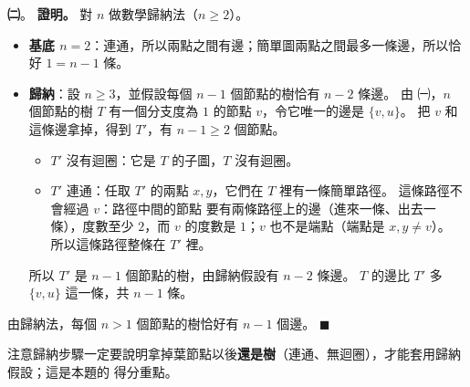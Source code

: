 \begin{pastsoln}
\textbf{㈡}。 \textbf{證明。} 對 $n$ 做數學歸納法（$n \ge 2$）。
\begin{itemize}
\item \textbf{基底 $n = 2$}：連通，所以兩點之間有邊；簡單圖兩點之間最多一條邊，所以恰好 $1 = n - 1$ 條。
\item \textbf{歸納}：設 $n \ge 3$，並假設每個 $n - 1$ 個節點的樹恰有 $n - 2$ 條邊。 由 ㈠，$n$ 個節點的樹 $T$
有一個分支度為 $1$ 的節點 $v$，令它唯一的邊是 $\{v, u\}$。 把 $v$ 和這條邊拿掉，得到 $T'$，有 $n - 1 \ge 2$
個節點。
  \begin{itemize}
  \item $T'$ 沒有迴圈：它是 $T$ 的子圖，$T$ 沒有迴圈。
  \item $T'$ 連通：任取 $T'$ 的兩點 $x, y$，它們在 $T$ 裡有一條簡單路徑。 這條路徑不會經過 $v$：路徑中間的節點
  要有兩條路徑上的邊（進來一條、出去一條），度數至少 $2$，而 $v$ 的度數是 $1$；$v$ 也不是端點（端點是
  $x, y \ne v$）。 所以這條路徑整條在 $T'$ 裡。
  \end{itemize}
  所以 $T'$ 是 $n - 1$ 個節點的樹，由歸納假設有 $n - 2$ 條邊。 $T$ 的邊比 $T'$ 多 $\{v, u\}$ 這一條，共
  $n - 1$ 條。
\end{itemize}
由歸納法，每個 $n > 1$ 個節點的樹恰好有 $n - 1$ 個邊。 \hfill$\blacksquare$

注意歸納步驟一定要說明拿掉葉節點以後\textbf{還是樹}（連通、無迴圈），才能套用歸納假設；這是本題的
得分重點。
\end{pastsoln}

